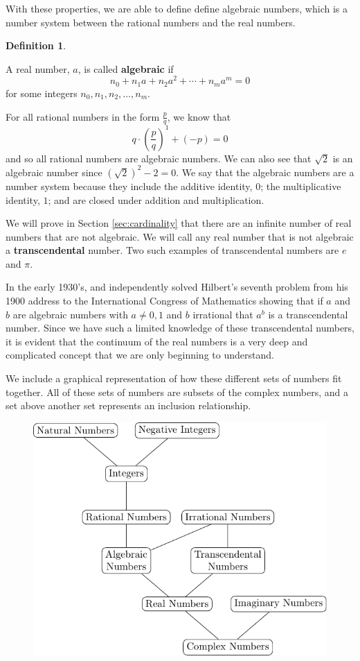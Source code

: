\documentclass[
]{book}
\theoremstyle{definition}
\newtheorem{definition}{Definition}[chapter]
\theoremstyle{definition}
\theoremstyle{definition}
\theoremstyle{definition}
\theoremstyle{remark}
\begin{document}
With these properties, we are able to define define algebraic numbers, which is a number system between the rational numbers and the real numbers.

\begin{definition}
\protect\hypertarget{def:algebraic-numbers}{}\label{def:algebraic-numbers}

A real number, \(a\), is called \textbf{algebraic} if \[n_0 + n_1 a + n_2 a^2 + \cdots + n_m a^m =0\] for some integers \(n_0, n_1, n_2, \ldots, n_m\).

\end{definition}

For all rational numbers in the form \(\frac{p}{q}\), we know that \[q \cdot \left(\frac{p}{q}\right)^1 + (-p) = 0\] and so all rational numbers are algebraic numbers. We can also see that \(\sqrt{2}\) is an algebraic number since \((\sqrt{2})^2-2=0\). We say that the algebraic numbers are a number system because they include the additive identity, \(0\); the multiplicative identity, \(1\); and are closed under addition and multiplication.

We will prove in Section \ref{sec:cardinality} that there are an infinite number of real numbers that are not algebraic. We will call any real number that is not algebraic a \textbf{transcendental} number. Two such examples of transcendental numbers are \(e\) and \(\pi\).

In the early 1930's, \citet{Gelfond} and \citet{Schneider} independently solved Hilbert's seventh problem from his 1900 address to the International Congress of Mathematics showing that if \(a\) and \(b\) are algebraic numbers with \(a\neq 0,1\) and \(b\) irrational that \(a^b\) is a transcendental number. Since we have such a limited knowledge of these transcendental numbers, it is evident that the continuum of the real numbers is a very deep and complicated concept that we are only beginning to understand.

We include a graphical representation of how these different sets of numbers fit together. All of these sets of numbers are subsets of the complex numbers, and a set above another set represents an inclusion relationship.

\begin{figure}

{\centering \includegraphics[width=0.6\linewidth]{tikz/NumberTree} 

}

\end{figure}
\end{document}
